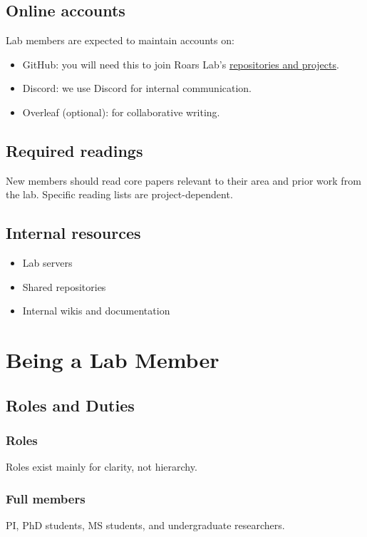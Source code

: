 \documentclass[11pt]{article}
\begin{document}
\subsection{Online accounts}
Lab members are expected to maintain accounts on:
\begin{itemize}
  \item GitHub: you will need this to join Roars Lab's \href{https://code.roars.dev}{repositories and projects}.
  \item Discord: we use Discord for internal communication.
  \item Overleaf (optional): for collaborative writing.
\end{itemize}


\subsection{Required readings}
New members should read core papers relevant to their area and prior work from the lab.
Specific reading lists are project-dependent.

\subsection{Internal resources}
\begin{itemize}
  \item Lab servers
  \item Shared repositories
  \item Internal wikis and documentation
\end{itemize}




\section{Being a Lab Member}

\subsection{Roles and Duties}

\subsubsection{Roles}
Roles exist mainly for clarity, not hierarchy.

\subsubsection{Full members}
PI, PhD students, MS students, and undergraduate researchers.
\end{document}
